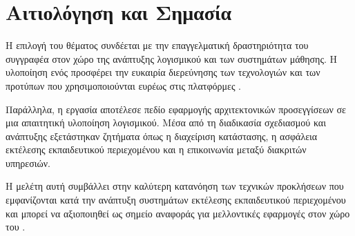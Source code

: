 \section{Αιτιολόγηση και Σημασία}

Η επιλογή του θέματος συνδέεται με την επαγγελματική δραστηριότητα του συγγραφέα στον χώρο της ανάπτυξης
λογισμικού και των συστημάτων μάθησης. Η υλοποίηση ενός  προσφέρει την ευκαιρία
διερεύνησης των τεχνολογιών και των προτύπων που χρησιμοποιούνται ευρέως στις πλατφόρμες
.

Παράλληλα, η εργασία αποτέλεσε πεδίο εφαρμογής αρχιτεκτονικών προσεγγίσεων σε μια απαιτητική
υλοποίηση λογισμικού. Μέσα από τη διαδικασία σχεδιασμού και ανάπτυξης εξετάστηκαν ζητήματα όπως
η διαχείριση κατάστασης, η ασφάλεια εκτέλεσης εκπαιδευτικού περιεχομένου και η επικοινωνία μεταξύ
διακριτών υπηρεσιών.

Η μελέτη αυτή συμβάλλει στην καλύτερη κατανόηση των τεχνικών προκλήσεων που εμφανίζονται κατά
την ανάπτυξη συστημάτων εκτέλεσης εκπαιδευτικού περιεχομένου και μπορεί να αξιοποιηθεί ως
σημείο αναφοράς για μελλοντικές εφαρμογές στον χώρο του .